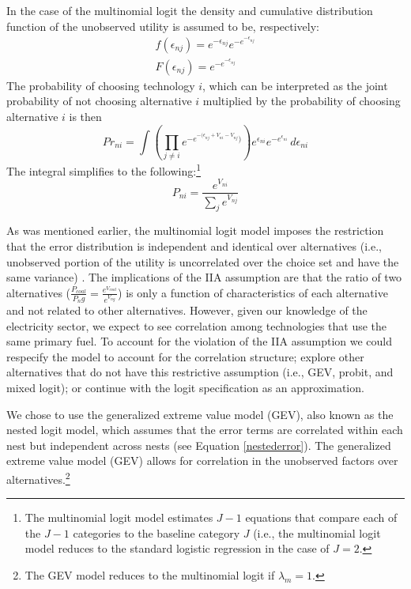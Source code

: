 \documentclass[10pt]{amsart}
\begin{document}
In the case of the multinomial logit the density and cumulative distribution function of the unobserved utility is assumed to be, respectively:
\begin{equation}
\begin{split}
f(\epsilon_{nj}) = e^{-\epsilon_{nj}}e^{-e^{-\epsilon_{nj}}} \\
F(\epsilon_{nj}) = e^{-e^{-\epsilon_{nj}}}
\end{split}
\end{equation}
The probability of choosing technology $i$, which can be interpreted as the joint probability of not choosing alternative $i$ multiplied by the probability of choosing alternative $i$ is then 
\begin{equation}
Pr_{ni} = \int \left(\prod_{j \neq i} e^{-e^{-(\epsilon_{nj} + V_{ni} - V_{nj}})}\right)e^{\epsilon_{ni}}e^{-e^{\epsilon_{ni}}} \,d\epsilon_{ni} 
\end{equation}
The integral simplifies to the following:\footnote{The multinomial logit model estimates $J - 1$ equations that compare each of the $J - 1$ categories to the baseline category $J$ (i.e., the multinomial logit model reduces to the standard logistic regression in the case of $J=2$.} 
\begin{equation}
P_{ni} = \frac{e^{V_{ni}}}{\sum_{j} e^{V_{nj}}}
\end{equation}

As was mentioned earlier, the multinomial logit model imposes the restriction that the error distribution is independent and identical over alternatives (i.e., unobserved portion of the utility is uncorrelated over the choice set and have the same variance) \parencite{wen2001generalized}.
The implications of the IIA assumption are that the ratio of two alternatives ($\frac{P_{coal}}{P_ng} = \frac{e^{V_{coal}}}{e^{V_{ng}}}$) is only a function of characteristics of each alternative and not related to other alternatives.
However, given our knowledge of the electricity sector, we expect to see correlation among technologies that use the same primary fuel. 
To account for the violation of the IIA assumption we could respecify the model to account for the correlation structure; explore other alternatives that do not have this restrictive assumption (i.e., GEV, probit, and mixed logit); or continue with the logit specification as an approximation.

We chose to use the generalized extreme value model (GEV), also known as the nested logit model, which assumes that the error terms are correlated within each nest but independent across nests (see Equation \ref{nestederror}).
The generalized extreme value model (GEV) allows for correlation in the unobserved factors over alternatives.\footnote{The GEV model reduces to the multinomial logit if $\lambda_m = 1$.} 
\end{document}
